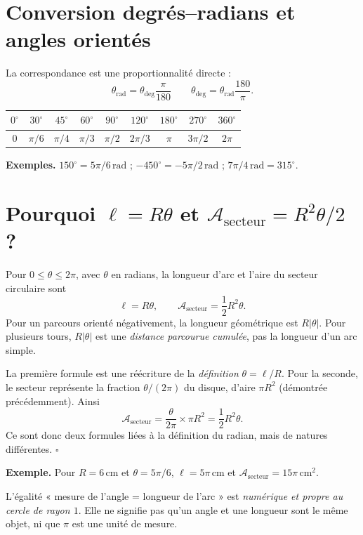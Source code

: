 \documentclass[../cours_spe_trigo.tex]{subfiles}
\begin{document}
\section{Conversion degrés--radians et angles orientés}
La correspondance est une proportionnalité directe :
\[
\boxed{\theta_{\mathrm{rad}}=\theta_{\mathrm{deg}}\frac\pi{180}}
\qquad
\boxed{\theta_{\mathrm{deg}}=\theta_{\mathrm{rad}}\frac{180}{\pi}}.
\]
\begin{center}
\begin{tabular}{ccccccccc}
\toprule
$0^\circ$ & $30^\circ$ & $45^\circ$ & $60^\circ$ & $90^\circ$ & $120^\circ$ & $180^\circ$ & $270^\circ$ & $360^\circ$ \\
\midrule
$0$ & $\pi/6$ & $\pi/4$ & $\pi/3$ & $\pi/2$ & $2\pi/3$ & $\pi$ & $3\pi/2$ & $2\pi$ \\
\bottomrule
\end{tabular}
\end{center}
\textbf{Exemples.} $150^\circ=5\pi/6\,\mathrm{rad}$ ; $-450^\circ=-5\pi/2\,\mathrm{rad}$ ; $7\pi/4\,\mathrm{rad}=315^\circ$.

\section{Pourquoi $\ell=R\theta$ et $\mathcal A_{\mathrm{secteur}}=R^2\theta/2$ ?}
\begin{propriete}
Pour $0\leq\theta\leq2\pi$, avec $\theta$ en radians, la longueur d'arc et l'aire du secteur circulaire sont
\[\boxed{\ell=R\theta,\qquad \mathcal A_{\mathrm{secteur}}=\frac12R^2\theta.}\]
Pour un parcours orienté négativement, la longueur géométrique est $R|\theta|$. Pour plusieurs tours, $R|\theta|$ est une \emph{distance parcourue cumulée}, pas la longueur d'un arc simple.
\end{propriete}
\begin{demonstration}
La première formule est une réécriture de la \emph{définition} $\theta=\ell/R$. Pour la seconde, le secteur représente la fraction $\theta/(2\pi)$ du disque, d'aire $\pi R^2$ (démontrée précédemment). Ainsi
\[
\mathcal A_{\mathrm{secteur}}=\frac{\theta}{2\pi}\times\pi R^2=\frac12R^2\theta.
\]
Ce sont donc deux formules liées à la définition du radian, mais de natures différentes. $\square$
\end{demonstration}
\textbf{Exemple.} Pour $R=6\,\mathrm{cm}$ et $\theta=5\pi/6$, $\ell=5\pi\,\mathrm{cm}$ et $\mathcal A_{\mathrm{secteur}}=15\pi\,\mathrm{cm}^2$.
\begin{attention}
L'égalité « mesure de l'angle = longueur de l'arc » est \emph{numérique et propre au cercle de rayon $1$}. Elle ne signifie pas qu'un angle et une longueur sont le même objet, ni que $\pi$ est une unité de mesure.
\end{attention}
\end{document}

